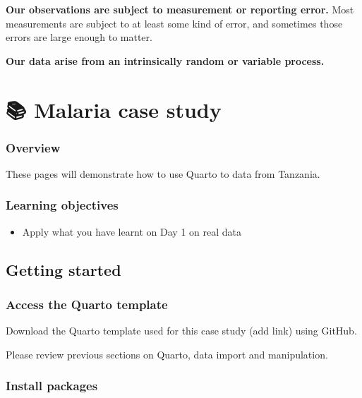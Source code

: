 \documentclass[
  letterpaper,
  DIV=11,
  numbers=noendperiod,
  oneside]{scrreprt}
\providecommand{\tightlist}{%
  \setlength{\itemsep}{0pt}\setlength{\parskip}{0pt}}\usepackage{longtable,booktabs,array}
\begin{document}
\textbf{Our observations are subject to measurement or reporting error.}
Most measurements are subject to at least some kind of error, and
sometimes those errors are large enough to matter.

\textbf{Our data arise from an intrinsically random or variable
process.}

\hypertarget{malaria-case-study}{%
\chapter{\texorpdfstring{{📚} Malaria case
study}{📚 Malaria case study}}\label{malaria-case-study}}

\hypertarget{overview-6}{%
\subsection{Overview}\label{overview-6}}

These pages will demonstrate how to use Quarto to data from Tanzania.

\hypertarget{learning-objectives-6}{%
\subsection{Learning objectives}\label{learning-objectives-6}}

\begin{itemize}
\tightlist
\item
  Apply what you have learnt on Day 1 on real data
\end{itemize}

\hypertarget{getting-started}{%
\section{Getting started}\label{getting-started}}

\hypertarget{access-the-quarto-template}{%
\subsection{Access the Quarto
template}\label{access-the-quarto-template}}

Download the Quarto template used for this case study (add link) using
GitHub.

Please review previous sections on Quarto, data import and manipulation.

\hypertarget{install-packages}{%
\subsection{Install packages}\label{install-packages}}
\end{document}
